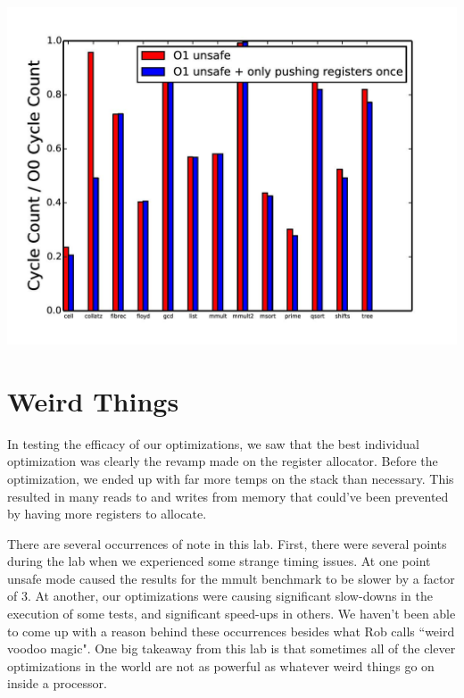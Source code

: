 \documentclass{article}
\begin{document}
\includegraphics[scale=0.5]{O1_vs_onlyPushOnce-page-001}

\section{Weird Things}

In testing the efficacy of our optimizations, we saw that the best individual optimization was clearly the revamp made on the register allocator. Before the optimization, we ended up with far more temps on the stack than necessary. This resulted in many reads to and writes from memory that could've been prevented by having more registers to allocate.

There are several occurrences of note in this lab. First, there were several points during the lab when we experienced some strange timing issues. At one point unsafe mode caused the results for the mmult benchmark to be slower by a factor of 3. At another, our optimizations were causing significant slow-downs in the execution of some tests, and significant speed-ups in others. We haven't been able to come up with a reason behind these occurrences besides what Rob calls ``weird voodoo magic". One big takeaway from this lab is that sometimes all of the clever optimizations in the world are not as powerful as whatever weird things go on inside a processor.
\end{document}
